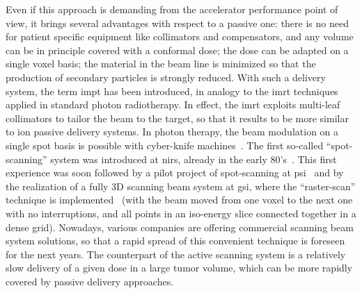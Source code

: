 Even if this approach is demanding from the accelerator performance point of view, it brings several advantages with respect to a passive one: there is no need for patient specific equipment like collimators and compensators, and any volume can be in principle covered with a conformal dose; the dose can be adapted on a single voxel basis; the material in the beam line is minimized so that the production of secondary particles is strongly reduced. 
With such a delivery system, the term \gls{impt} has been introduced, in analogy to the \gls{imrt} techniques applied in standard photon radiotherapy. In effect, the \gls{imrt} exploits multi-leaf collimators to tailor the beam to the target, so that it results to be more similar to ion passive delivery systems. In photon therapy, the beam modulation on a single spot basis is possible with cyber-knife machines~\parencite{Srivastava2015}.   
The first so-called \enquote{spot-scanning} system was introduced at \gls{nirs}, already in the early 80's~\parencite{Kanai1983}. This first experience was soon followed by a pilot project of spot-scanning at \gls{psi}~\parencite{Pedroni1995} and by the realization of a fully 3D scanning beam system at \gls{gsi}, where the \enquote{raster-scan} technique is implemented~\parencite{Haberer1993} (with the beam moved from one voxel to the next one with no interruptions, and all points in an iso-energy slice connected together in a dense grid). 
Nowadays, various companies are offering commercial scanning beam system solutions, so that a rapid spread of this convenient technique is foreseen for the next years. The counterpart of the active scanning system is a relatively slow delivery of a given dose in a large tumor volume, which can be more rapidly covered by passive delivery approaches.  
 
